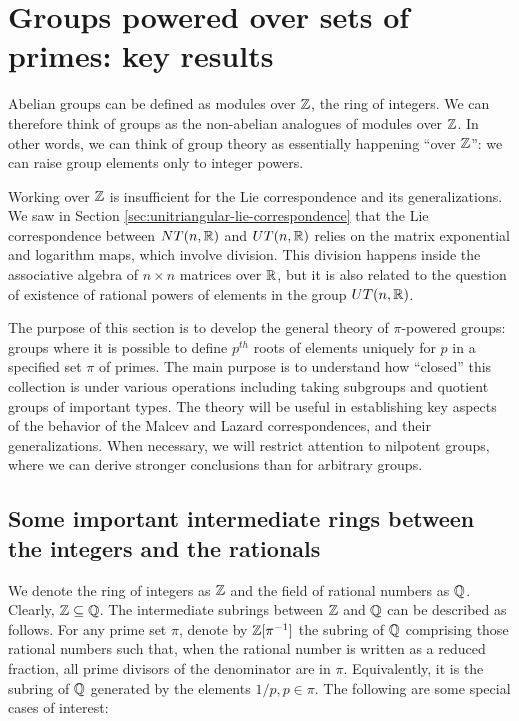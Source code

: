 

\section{Groups powered over sets of primes: key results}\label{sec:group-powering}

Abelian groups can be defined as modules over $\mathbb{Z}$, the ring of
integers. We can therefore think of groups as the non-abelian
analogues of modules over $\mathbb{Z}$. In other words, we can think of group
theory as essentially happening ``over $\mathbb{Z}$'': we can raise group
elements only to integer powers.

Working over $\mathbb{Z}$ is insufficient for the Lie correspondence and its
generalizations. We saw in Section
\ref{sec:unitriangular-lie-correspondence} that the Lie correspondence
between $NT(n,\mathbb{R})$ and $UT(n,\mathbb{R})$ relies on the matrix exponential and
logarithm maps, which involve division. This division happens inside
the associative algebra of $n \times n$ matrices over $\mathbb{R}$, but it is
also related to the question of existence of rational powers of
elements in the group $UT(n,\mathbb{R})$.

The purpose of this section is to develop the general theory of
$\pi$-powered groups: groups where it is possible to define $p^{th}$
roots of elements uniquely for $p$ in a specified set $\pi$ of
primes. The main purpose is to understand how ``closed'' this
collection is under various operations including taking subgroups and
quotient groups of important types. The theory will be useful in
establishing key aspects of the behavior of the Malcev and Lazard
correspondences, and their generalizations. When necessary, we will
restrict attention to nilpotent groups, where we can derive stronger
conclusions than for arbitrary groups.

\subsection{Some important intermediate rings between the integers and the rationals}

We denote the ring of integers as $\mathbb{Z}$ and the field of rational
numbers as $\mathbb{Q}$. Clearly, $\mathbb{Z} \subseteq \mathbb{Q}$. The intermediate subrings
between $\mathbb{Z}$ and $\mathbb{Q}$ can be described as follows. For any prime set
$\pi$, denote by $\mathbb{Z}[\pi^{-1}]$ the subring of $\mathbb{Q}$ comprising those
rational numbers such that, when the rational number is written as a
reduced fraction, all prime divisors of the denominator are in
$\pi$. Equivalently, it is the subring of $\mathbb{Q}$ generated by the
elements $1/p, p \in \pi$. The following are some special cases of
interest:

